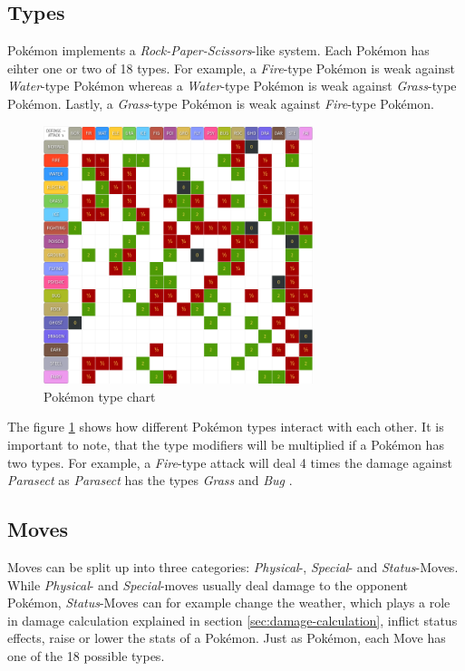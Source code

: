 \subsection{Types}
Pokémon implements a \textit{Rock-Paper-Scissors}-like system. Each Pokémon has eihter one or two of 
18 types. For example, a \textit{Fire}-type Pokémon is weak against \textit{Water}-type Pokémon
whereas a \textit{Water}-type Pokémon is weak against \textit{Grass}-type Pokémon. Lastly,
a \textit{Grass}-type Pokémon is weak against \textit{Fire}-type Pokémon. 
\begin{figure}
	\centering
	\includegraphics[width=0.7\textwidth]{images/type_chart.png}
	\caption{Pokémon type chart \cite{Pokemondb:Type}}
	\label{fig:type_chart}
\end{figure}
The figure \ref{fig:type_chart} shows how different Pokémon types interact with each other. It is important
to note, that the type modifiers will be multiplied if a Pokémon has two types. For example, a \textit{Fire}-type
attack will deal 4 times the damage against \textit{Parasect} as \textit{Parasect} has the types \textit{Grass} and
\textit{Bug} \cite{Veekun:Parasect}.

\subsection{Moves}
\label{sec:moves}
Moves can be split up into three categories: \textit{Physical}-, \textit{Special}- and \textit{Status}-Moves.
While \textit{Physical}- and \textit{Special}-moves usually deal damage to the opponent Pokémon, 
\textit{Status}-Moves can for example change the weather, which plays a role in damage calculation explained
in section \ref{sec:damage-calculation}, inflict status effects, raise or lower the stats of a Pokémon. Just 
as Pokémon, each Move has one of the 18 possible types. 

